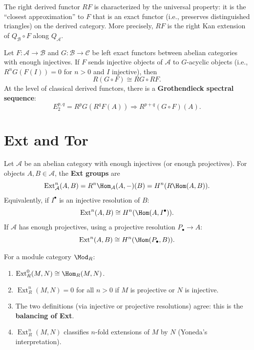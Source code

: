 \begin{remark}\label{rem:derived-universal}
The right derived functor $RF$ is characterized by the universal property: it is the
``closest approximation'' to $F$ that is an exact functor (i.e., preserves distinguished
triangles) on the derived category. More precisely, $RF$ is the right Kan extension
of $Q_{\mathcal{B}} \circ F$ along $Q_{\mathcal{A}}$.
\end{remark}

\begin{theorem}\label{thm:grothendieck-spectral}
Let $F \colon \mathcal{A} \to \mathcal{B}$ and $G \colon \mathcal{B} \to \mathcal{C}$
be left exact functors between abelian categories with enough injectives. If $F$ sends
injective objects of $\mathcal{A}$ to $G$-acyclic objects (i.e., $R^n G(F(I)) = 0$ for
$n > 0$ and $I$ injective), then
\[
    R(G \circ F) \cong RG \circ RF.
\]
At the level of classical derived functors, there is a \textbf{Grothendieck spectral sequence}:
\[
    E_2^{p,q} = R^p G(R^q F(A)) \Longrightarrow R^{p+q}(G \circ F)(A).
\]
\end{theorem}


\section{Ext and Tor}\label{sec:ext-tor}

\begin{definition}\label{def:ext}
Let $\mathcal{A}$ be an abelian category with enough injectives (or enough projectives).
For objects $A, B \in \mathcal{A}$, the \textbf{Ext groups} are
\[
    \operatorname{Ext}^n_{\mathcal{A}}(A, B) = R^n \Hom_{\mathcal{A}}(A, -)(B)
    = H^n(R\Hom(A, B)).
\]
Equivalently, if $I^\bullet$ is an injective resolution of $B$:
\[
    \operatorname{Ext}^n(A, B) \cong H^n(\Hom(A, I^\bullet)).
\]
If $\mathcal{A}$ has enough projectives, using a projective resolution $P_\bullet \to A$:
\[
    \operatorname{Ext}^n(A, B) \cong H^n(\Hom(P_\bullet, B)).
\]
\end{definition}

\begin{proposition}\label{prop:ext-properties}
For a module category $\Mod_R$:
\begin{enumerate}
    \item $\operatorname{Ext}^0_R(M, N) \cong \Hom_R(M, N)$.
    \item $\operatorname{Ext}^n_R(M, N) = 0$ for all $n > 0$ if $M$ is projective or $N$
    is injective.
    \item The two definitions (via injective or projective resolutions) agree: this is
    the \textbf{balancing of Ext}.
    \item $\operatorname{Ext}^n_R(M, N)$ classifies $n$-fold extensions of $M$ by $N$
    (Yoneda's interpretation).
\end{enumerate}
\end{proposition}

